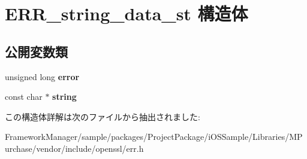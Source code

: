 \hypertarget{struct_e_r_r__string__data__st}{}\section{E\+R\+R\+\_\+string\+\_\+data\+\_\+st 構造体}
\label{struct_e_r_r__string__data__st}
\subsection*{公開変数類}
\begin{DoxyCompactItemize}
\item 
\hypertarget{struct_e_r_r__string__data__st_a31cec2470a4a78675d42e43bca29eb73}{}unsigned long {\bfseries error}\label{struct_e_r_r__string__data__st_a31cec2470a4a78675d42e43bca29eb73}

\item 
\hypertarget{struct_e_r_r__string__data__st_a8533e685b5daab9b3860db861e468361}{}const char $\ast$ {\bfseries string}\label{struct_e_r_r__string__data__st_a8533e685b5daab9b3860db861e468361}

\end{DoxyCompactItemize}


この構造体詳解は次のファイルから抽出されました\+:\begin{DoxyCompactItemize}
\item 
Framework\+Manager/sample/packages/\+Project\+Package/i\+O\+S\+Sample/\+Libraries/\+M\+Purchase/vendor/include/openssl/err.\+h\end{DoxyCompactItemize}
